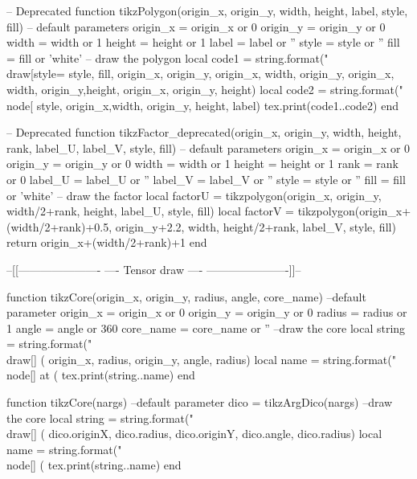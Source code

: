 \begin{luacode*}
	-- Deprecated
	function tikzPolygon(origin_x, origin_y, width, height, label, style, fill)
	-- default parameters
	origin_x = origin_x or 0
	origin_y = origin_y or 0
	width = width or 1
	height = height or 1
	label = label or ''
	style = style or ''
	fill = fill or 'white'
	-- draw the polygon
	local code1 = string.format("\\draw[style=%
	style, fill, origin_x, origin_y, origin_x, width, origin_y, origin_x, width,
	origin_y,height, origin_x, origin_y, height)
	local code2 = string.format("\\node[%
	style, origin_x,width, origin_y, height, label)
	tex.print(code1..code2)
	end
  
	-- Deprecated
	function tikzFactor_deprecated(origin_x, origin_y, width, height, rank, label_U,
	label_V, style, fill)
	-- default parameters
	origin_x = origin_x or 0
	origin_y = origin_y or 0
	width = width or 1
	height = height or 1
	rank = rank or 0
	label_U = label_U or ''
	label_V = label_V or ''
	style = style or ''
	fill = fill or 'white'
	-- draw the factor
	local factorU = tikzpolygon(origin_x, origin_y, width/2+rank, height, label_U,
	style, fill)
	local factorV = tikzpolygon(origin_x+(width/2+rank)+0.5, origin_y+2.2, width,
	height/2+rank, label_V, style, fill)
	return origin_x+(width/2+rank)+1
	end
  
	--[[----------------------
	----    Tensor draw   ----
	----------------------]]--
  
	function tikzCore(origin_x, origin_y, radius, angle, core_name)
		--default parameter
		origin_x = origin_x or 0
		origin_y = origin_y or 0
		radius = radius or 1
		angle = angle or 360
		core_name = core_name or ''
		--draw the core
		local string = string.format("\\draw[] (%
		origin_x, radius, origin_y, angle, radius)
		local name = string.format("\\node[] at (%
		tex.print(string..name)
	end

	function tikzCore(nargs)
		--default parameter
		dico = tikzArgDico(nargs)
		--draw the core
		local string = string.format("\\draw[] (%
		dico.originX, dico.radius, dico.originY, dico.angle, dico.radius)
		local name = string.format("\\node[] (%
		tex.print(string..name)
	end
  

\end{luacode*}

